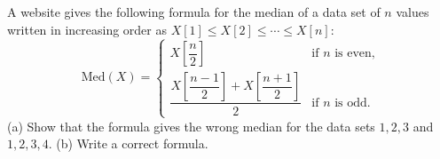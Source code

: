 A website gives the following formula for the median of a data set of $n$ values written in increasing order as $X[1]\le X[2]\le\cdots\le X[n]$:
\[\mathrm{Med}(X)=\begin{cases}X\left[\dfrac n2\right]&\text{if }n\text{ is even,}\\[2ex]\dfrac{X\left[\dfrac{n-1}{2}\right]+X\left[\dfrac{n+1}{2}\right]}{2}&\text{if }n\text{ is odd.}\end{cases}\]
(a) Show that the formula gives the wrong median for the data sets $1,2,3$ and $1,2,3,4$. (b) Write a correct formula.
